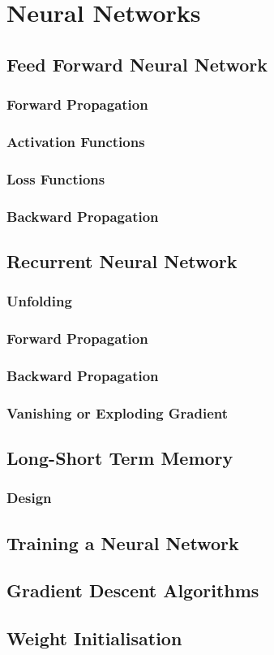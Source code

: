 \chapter{Neural Networks}
\section{Feed Forward Neural Network}
\subsection{Forward Propagation}
\subsection{Activation Functions}
\subsection{Loss Functions}
\subsection{Backward Propagation}
\section{Recurrent Neural Network}
\subsection{Unfolding}
\subsection{Forward Propagation}
\subsection{Backward Propagation}
\subsection{Vanishing or Exploding Gradient}
\section{Long-Short Term Memory}
\subsection{Design}
\section{Training a Neural Network}
\section{Gradient Descent Algorithms}
\section{Weight Initialisation}